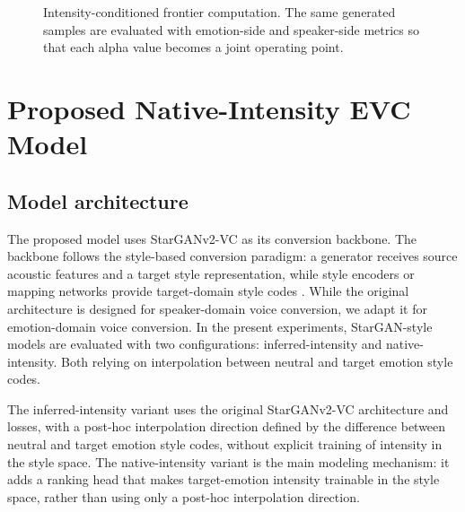 \begin{figure}[t]
\centering
{}
\caption{Intensity-conditioned frontier computation. The same generated samples are evaluated with emotion-side and speaker-side metrics so that each alpha value becomes a joint operating point.}
\label{fig:frontier-protocol}
\end{figure}


\section{Proposed Native-Intensity EVC Model}
\label{sec:proposed-model}

\subsection{Model architecture}
The proposed model uses StarGANv2-VC as its conversion backbone.
The backbone follows the style-based conversion paradigm: a generator receives source acoustic features and a target style representation, while style encoders or mapping networks provide target-domain style codes \cite{li2021starganv2vc}.
While the original architecture is designed for speaker-domain voice conversion, we adapt it for emotion-domain voice conversion.
In the present experiments, StarGAN-style models are evaluated with two configurations: inferred-intensity and native-intensity. Both relying on interpolation between neutral and target emotion style codes. 

The inferred-intensity variant uses the original StarGANv2-VC architecture and losses, with a post-hoc interpolation direction defined by the difference between neutral and target emotion style codes, without explicit training of intensity in the style space.
The native-intensity variant is the main modeling mechanism: it adds a ranking head that makes target-emotion intensity trainable in the style space, rather than using only a post-hoc interpolation direction.

